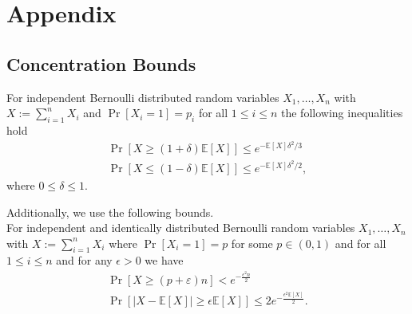 \chapter{Appendix}
\section{Concentration Bounds}
\begin{lemma}
For independent Bernoulli distributed random variables $X_1, \dotsc, X_n$ with $X := \sum_{i=1}^n X_i$
and $\Pr[X_i = 1] = p_i$ for all $ 1 \leq  i \leq n$ the following inequalities hold
\begin{gather}
\label{ineq:ch0}
\Pr[X \geq (1+\delta) \mathbb{E}[X]] \leq e^{- \mathbb{E}[X] \delta^2/3} \\
\label{ineq:ch1}
\Pr[X \leq (1-\delta) \mathbb{E}[X]] \leq e^{- \mathbb{E}[X] \delta^2/2},
\end{gather}
where $0 \leq \delta \leq 1$.

\textnormal{Additionally, we use the following bounds.} \\
For independent and identically distributed Bernoulli random variables $X_1, \dotsc, X_n$ with $X := \sum_{i=1}^n X_i$
where $\Pr[X_i = 1] = p$ for some $p \in (0,1)$ and for all $ 1 \leq  i \leq n$ and
for any $\epsilon > 0$ we have
\begin{gather}
\label{ineq:ch3}
\Pr[X \geq (p + \varepsilon)n] < e^{-\frac{\epsilon^2n}{2}} \\
\label{ineq:ch2}
\Pr[| X - \mathbb{E}[X]| \geq \epsilon\mathbb{E}[X]] \leq 2e^{-\frac{\epsilon^2 \mathbb{E}[X]}{2}}.
\end{gather}
\end{lemma}
\vspace*{\fill}
\pagebreak

